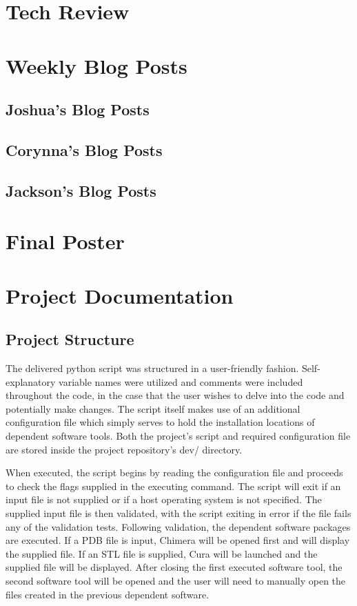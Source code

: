 \documentclass[letterpaper, onecolumn, draftclsnofoot, 10pt, compsoc]{IEEEtran}
\begin{document}
\begin{singlespace}
\begin{itemize}
\end{itemize}
\section{Tech Review}


\section{Weekly Blog Posts}
\subsection{Joshua's Blog Posts}

\subsection{Corynna's Blog Posts}

\subsection{Jackson's Blog Posts}


\section{Final Poster}


\section{Project Documentation}
\subsection{Project Structure} %
The delivered python script was structured in a user-friendly fashion. Self-explanatory variable names were utilized and comments were included throughout the code, in the case that the user wishes to delve into the code and potentially make changes. The script itself makes use of an additional configuration file which simply serves to hold the installation locations of dependent software tools. Both the project's script and required configuration file are stored inside the project repository's dev/ directory. \par
When executed, the script begins by reading the configuration file and proceeds to check the flags supplied in the executing command. The script will exit if an input file is not supplied or if a host operating system is not specified. The supplied input file is then validated, with the script exiting in error if the file fails any of the validation tests. Following validation, the dependent software packages are executed. If a PDB file is input, Chimera will be opened first and will display the supplied file. If an STL file is supplied, Cura will be launched and the supplied file will be displayed. After closing the first executed software tool, the second software tool will be opened and the user will need to manually open the files created in the previous dependent software.

\end{singlespace}
\end{document}
